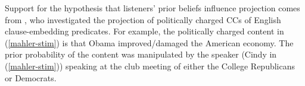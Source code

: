 \documentclass[11pt,fleqn]{article}
\newcommand{\6}{\mbox{$[\hspace*{-.6mm}[$}}
\newcommand{\9}{\mbox{$]\hspace*{-.6mm}]$}}
\begin{document}



%


Support for the hypothesis that listeners' prior beliefs influence projection comes from , who investigated the projection of politically charged CCs of %
English clause-embedding predicates. %
For example, the politically charged content in (\ref{mahler-stim}) is that Obama improved/damaged the American economy. The prior probability of the content was manipulated by the speaker (Cindy in (\ref{mahler-stim})) speaking at the club meeting of either the College Republicans or Democrats.
\end{document}

